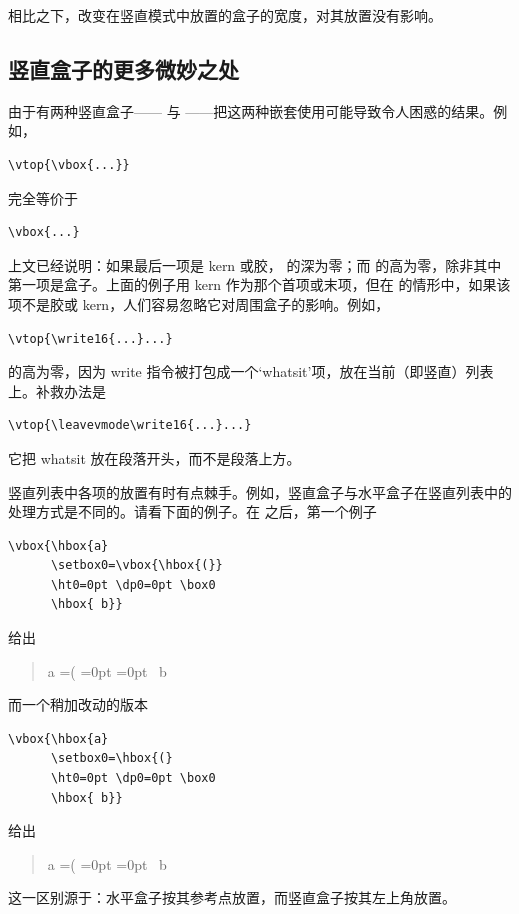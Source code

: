 \documentclass[a4paper]{rapport3}
\newenvironment{disp}{\begin{quotation}}{\end{quotation}}
\begin{document}
相比之下，改变在竖直模式中放置的盒子的宽度，对其放置没有影响。

\subsection{竖直盒子的更多微妙之处}

由于有两种竖直盒子—— 与 ——把这两种嵌套使用可能导致令人困惑的结果。例如，
\begin{verbatim}
\vtop{\vbox{...}}
\end{verbatim}
完全等价于
\begin{verbatim}
\vbox{...}
\end{verbatim}

上文已经说明：如果最后一项是 kern 或胶， 的深为零；而  的高为零，除非其中第一项是盒子。上面的例子用 kern 作为那个首项或末项，但在  的情形中，如果该项不是胶或 kern，人们容易忽略它对周围盒子的影响。例如，
\begin{verbatim}
\vtop{\write16{...}...}
\end{verbatim}
的高为零，因为 write 指令被打包成一个`whatsit'项，放在当前（即竖直）列表上。补救办法是
\begin{verbatim}
\vtop{\leavevmode\write16{...}...}
\end{verbatim}
它把 whatsit 放在段落开头，而不是段落上方。

竖直列表中各项的放置有时有点棘手。例如，竖直盒子与水平盒子在竖直列表中的处理方式是不同的。请看下面的例子。在  之后，第一个例子
\begin{verbatim}
\vbox{\hbox{a}
      \setbox0=\vbox{\hbox{(}}
      \ht0=0pt \dp0=0pt \box0
      \hbox{ b}}
\end{verbatim}
给出
\begin{disp}\offinterlineskip\leavevmode\vbox{\hbox{a}
      =\vbox{\hbox{(}}
      =0pt =0pt 
      \hbox{ b}}
\end{disp}
而一个稍加改动的版本
\begin{verbatim}
\vbox{\hbox{a}
      \setbox0=\hbox{(}
      \ht0=0pt \dp0=0pt \box0
      \hbox{ b}}
\end{verbatim}
\awp
给出
\begin{disp}\offinterlineskip\leavevmode\vbox{\hbox{a}
      =\hbox{(}
      =0pt =0pt
      \hbox{ b}}
\end{disp}
这一区别源于：水平盒子按其参考点放置，而竖直盒子按其左上角放置。
\end{document}

